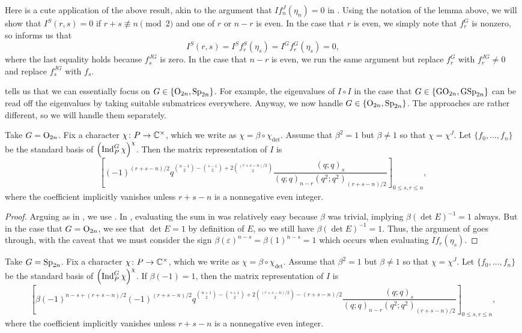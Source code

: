 \begin{remark}
	Here is a cute application of the above result, akin to the argument that $If_n^J(\eta_n)=0$ in . Using the notation of the lemma above, we will show that $I^S(r,s)=0$ if $r+s\not\equiv n\pmod 2$ and one of $r$ or $n-r$ is even. In the case that $r$ is even, we simply note that $f_r^G$ is nonzero, so  informs us that
	\[I^S(r,s)=I^Sf_r^S(\eta_s)=I^Gf_r^G(\eta_s)=0,\]
	where the last equality holds because $f_s^{JG}$ is zero. In the case that $n-r$ is even, we run the same argument but replace $f_r^G$ with $f_r^{JG}\ne0$ and replace $f_s^{JG}$ with $f_s$.
\end{remark}
 tells us that we can essentially focus on $G\in\{\mathrm{O}_{2n},\mathrm{Sp}_{2n}\}$. For example, the eigenvalues of $I\circ I$ in the case that $G\in\{\mathrm{GO}_{2n},\mathrm{GSp}_{2n}\}$ can be read off the eigenvalues by taking suitable submatrices everywhere. Anyway, we now handle $G\in\{\mathrm{O}_{2n},\mathrm{Sp}_{2n}\}$. The approaches are rather different, so we will handle them separately.
\begin{proposition}
	Take $G=\mathrm{O}_{2n}$. Fix a character $\chi\colon P\to\mathbb C^\times$, which we write as $\chi=\beta\circ\chi_{\det}$. Assume that $\beta^2=1$ but $\beta\ne1$ so that $\chi=\chi^J$. Let $\{f_0,\ldots,f_n\}$ be the standard basis of $\left(\operatorname{Ind}_P^G\chi\right)^\chi$. Then the matrix representation of $I$ is
	\[\left[(-1)^{(r+s-n)/2}q^{\binom{n-1}2-\binom{s-1}2+2\binom{(r+s-n)/2}2}\frac{(q;q)_s}{(q;q)_{n-r}(q^2;q^2)_{(r+s-n)/2}}\right]_{0\le s,r\le n},\]
	where the coefficient implicitly vanishes unless $r+s-n$ is a nonnegative even integer.
\end{proposition}
\begin{proof}
	Arguing as in , we use . In , evaluating the sum in  was relatively easy because $\beta$ was trivial, implying $\beta(\det E)^{-1}=1$ always. But in the case that $G=\mathrm{O}_{2n}$, we see that $\det E=1$ by definition of $E$, so we still have $\beta(\det E)^{-1}=1$. Thus, the argument of  goes through, with the caveat that we must consider the sign $\beta(\varepsilon)^{n-s}=\beta(1)^{n-s}=1$ which occurs when evaluating $If_r(\eta_s)$.
\end{proof}
\begin{proposition}
	Take $G=\mathrm{Sp}_{2n}$. Fix a character $\chi\colon P\to\mathbb C^\times$, which we write as $\chi=\beta\circ\chi_{\det}$. Assume that $\beta^2=1$ but $\beta\ne1$ so that $\chi=\chi^J$. Let $\{f_0,\ldots,f_n\}$ be the standard basis of $\left(\operatorname{Ind}_P^G\chi\right)^\chi$. If $\beta(-1)=1$, then the matrix representation of $I$ is
	\[\left[\beta(-1)^{n-s+(r+s-n)/2}(-1)^{(r+s-n)/2}q^{\binom{n+1}2-\binom{s+1}2+2\binom{(r+s-n)/2}2-(r+s-n)/2}\frac{(q;q)_s}{(q;q)_{n-r}(q^2;q^2)_{(r+s-n)/2}}\right]_{0\le s,r\le n},\]
	where the coefficient implicitly vanishes unless $r+s-n$ is a nonnegative even integer.
\end{proposition}
